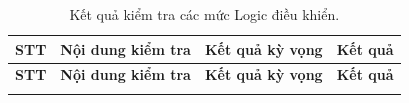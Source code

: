                 \begin{longtable}{|c|p{}|p{}|c|}
                    \caption{Kết quả kiểm tra các mức Logic điều khiển.}
                    \label{tab:logic_verification} \\
                    \hline
                    \textbf{STT} & \textbf{Nội dung kiểm tra} & \textbf{Kết quả kỳ vọng} & \textbf{Kết quả} \\ \hline
                    \endfirsthead
                
                    \hline
                    \textbf{STT} & \textbf{Nội dung kiểm tra} & \textbf{Kết quả kỳ vọng} & \textbf{Kết quả} \\ \hline
                    \endhead
                
                    \hline
                    \endfoot
                    \endlastfoot
                

\end{longtable}
